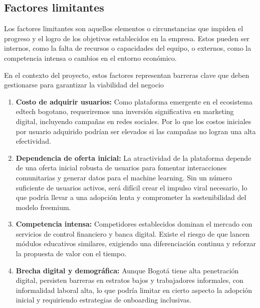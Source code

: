 \subsection*{Factores limitantes}

Los factores limitantes son aquellos elementos o circunstancias que impiden el progreso y el logro de los objetivos establecidos en la empresa. Estos pueden ser internos, como la falta de recursos o capacidades del equipo, o externos, como la competencia intensa o cambios en el entorno económico. 

En el contexto del proyecto, estos factores representan barreras clave que deben gestionarse para garantizar la viabilidad del negocio

\begin{enumerate}
	\item \textbf{Costo de adquirir usuarios:} Como plataforma emergente en el ecosistema edtech bogotano, requeriremos una inversión significativa en marketing digital, incluyendo campañas en redes sociales. Por lo que los costos iniciales por usuario adquirido podrían ser elevados si las campañas no logran una alta efectividad.
	
	\item \textbf{Dependencia de oferta inicial:} La atractividad de la plataforma depende de una oferta inicial robusta de usuarios para fomentar interacciones comunitarias y generar datos para el machine learning. Sin un número suficiente de usuarios activos, será difícil crear el impulso viral necesario, lo que podría llevar a una adopción lenta y comprometer la sostenibilidad del modelo freemium.
	
	\item \textbf{Competencia intensa:} Competidores establecidos dominan el mercado con servicios de control financiero y banca digital. Existe el riesgo de que lancen módulos educativos similares, exigiendo una diferenciación continua y reforzar la propuesta de valor con el tiempo.
	
	\item \textbf{Brecha digital y demográfica:} Aunque Bogotá tiene alta penetración digital, persisten barreras en estratos bajos y trabajadores informales, con informalidad laboral alta, lo que podría limitar en cierto aspecto la adopción inicial y requiriendo estrategias de onboarding inclusivas.
\end{enumerate}